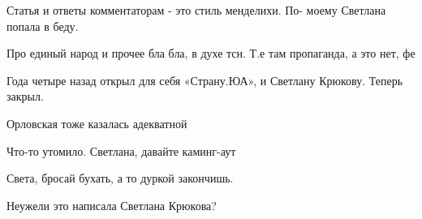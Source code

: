 \begin{itemize}
 
Статья и ответы комментаторам - это стиль менделихи. По- моему Светлана попала в беду.

 
Про единый народ и прочее бла бла, в духе тсн. Т.е там пропаганда, а это нет, фе

 
Года четыре назад открыл для себя «Страну.ЮА», и Светлану Крюкову. Теперь закрыл.

 
Орловская тоже казалась адекватной

 
Что-то утомило. Светлана, давайте каминг-аут

 
Света, бросай бухать, а то дуркой закончишь.

 
Неужели это написала Светлана Крюкова?


\end{itemize}
